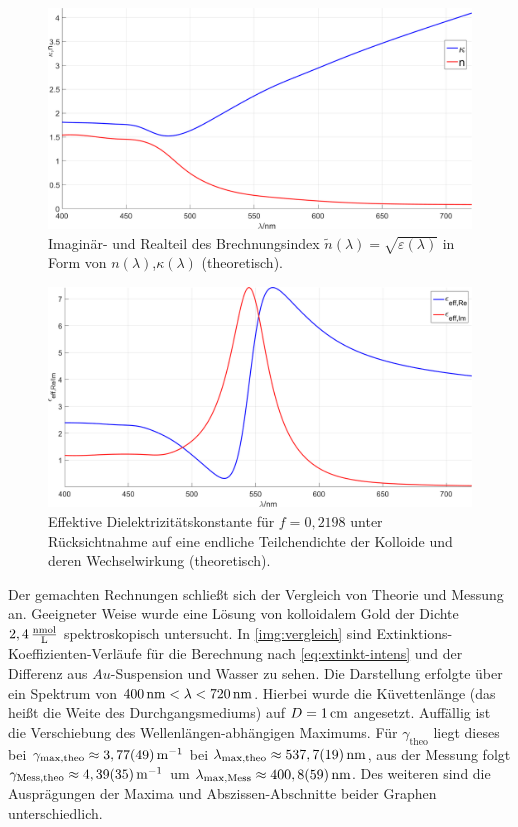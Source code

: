 \documentclass[numbers=noenddot,a4paper,notitlepage,twoside,BCOR15mm]{scrartcl}
\newcommand{\ix}[1]{_\text{#1}}
\begin{document}
				\begin{figure}[H]
					\includegraphics[width=\textwidth]{kappaun_uber_lambda.png}
					\caption{Imaginär- und Realteil des Brechnungsindex $\tilde{n}(\lambda)=\sqrt{\varepsilon(\lambda)}$ in Form von $n(\lambda)$,$\kappa(\lambda)$ (theoretisch).}
					\label{img:kappaun}
				\end{figure}

				\begin{figure}[H]
					\includegraphics[width=\textwidth]{epsilon_eff_uber_lambda.png}
					\caption{Effektive Dielektrizitätskonstante für $f=0,2198$ unter Rücksichtnahme auf eine endliche Teilchendichte der Kolloide und deren Wechselwirkung (theoretisch).}
					\label{img:epsilon_eff}
				\end{figure}

			Der gemachten Rechnungen schließt sich der Vergleich von Theorie und Messung an. Geeigneter Weise wurde eine Lösung von kolloidalem Gold der Dichte $\unit[2,4]{\frac{nmol}{L}}$ spektroskopisch untersucht. In \autoref{img:vergleich} sind Extinktions-Koeffizienten-Verläufe für die Berechnung nach \autoref{eq:extinkt-intens} und der Differenz aus $Au$-Suspension und Wasser zu sehen.  Die Darstellung erfolgte über ein Spektrum von $\unit[400]{nm}<\lambda<\unit[720]{nm}$. Hierbei wurde die Küvettenlänge (das heißt die Weite des Durchgangsmediums) auf $D=\unit[1]{cm}$ angesetzt. Auffällig ist die Verschiebung des Wellenlängen-abhängigen Maximums. Für $\gamma\ix{theo}$ liegt dieses bei $\gamma\ix{max,theo}\approx\unit[3,77(49)]{m^{-1}}$ bei $\lambda\ix{max,theo}\approx\unit[537,7(19)]{nm}$, aus der Messung folgt $\gamma\ix{Mess,theo}\approx\unit[4,39(35)]{m^{-1}}$ um $\lambda\ix{max,Mess}\approx\unit[400,8(59)]{nm}$. Des weiteren sind die Ausprägungen der Maxima und Abszissen-Abschnitte beider Graphen unterschiedlich.
\end{document}
